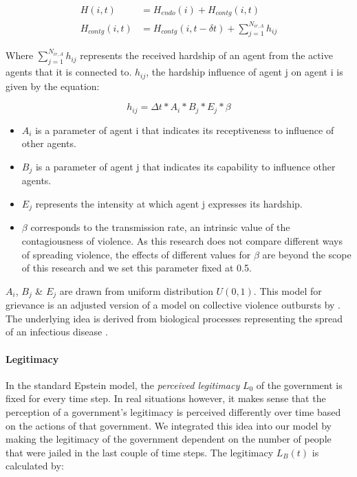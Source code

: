 \documentclass[10pt]{article}
\begin{document}
    \begin{align}
        H(i, t) &= H_{endo}(i) + H_{contg}(i, t)\\
        H_{contg}(i,t) &= H_{contg}(i,t - \delta t) + \sum\limits_{j = 1}^{N_{ir, A}} h_{ij}
    \end{align}

    Where $\sum\limits_{j = 1}^{N_{ir, A}} h_{ij}$ represents the received hardship of an agent from the active agents that it is connected to. $h_{ij}$, the hardship influence of agent j on agent i is given by the equation:

    \begin{equation}
        h_{ij} = \Delta t  * A_i * B_j * E_j*\beta
        \label{eq:extended_hardship}
    \end{equation}

    \begin{itemize}[noitemsep]
        \item $A_i$ is a parameter of agent i that indicates its receptiveness to influence of other agents.
        \item $B_j$ is a parameter of agent j that indicates its capability to influence other agents.
        \item $E_j$ represents the intensity at which agent j expresses its hardship.
        \item $\beta$ corresponds to the transmission rate, an intrinsic value of the contagiousness of violence. As this research does not compare different ways of spreading violence, the effects of different values for $\beta$ are beyond the scope of this research and we set this parameter fixed at 0.5.
    \end{itemize}


    $A_i$, $B_j$ \& $E_j$ are drawn from uniform distribution $U(0,1)$. This model for grievance is an adjusted version of a model on collective violence outbursts by \citet{huang2018}. The underlying idea is derived from biological processes representing the spread of an infectious disease \citet{fu2014simulation}.

    \paragraph{Legitimacy}
    In the standard Epstein model, the \emph{perceived legitimacy} $L_0$ of the government is fixed for every time step. In real situations however, it makes sense that the perception of a government's legitimacy is perceived differently over time based on the actions of that government. We integrated this idea into our model by making the legitimacy of the government dependent on the number of people that were jailed in the last couple of time steps. The legitimacy $L_B(t)$ is calculated by:
\end{document}
